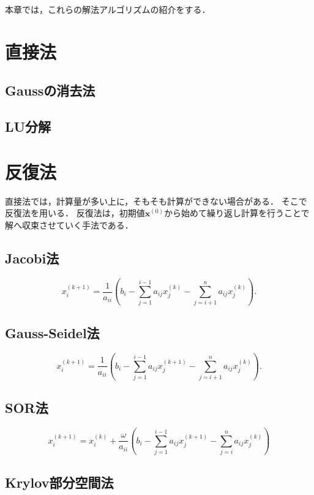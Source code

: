 本章では，これらの解法アルゴリズムの紹介をする．

\section{直接法}
\subsection{Gaussの消去法}

\subsection{LU分解}

\section{反復法}
直接法では，計算量が多い上に，そもそも計算ができない場合がある．
そこで反復法を用いる．
反復法は，初期値$\bm{x}^{(0)}$から始めて繰り返し計算を行うことで解へ収束させていく手法である．

\subsection{Jacobi法}
\begin{equation}
\label{e:jacobi}
x_i^{(k+1)}=\frac{1}{a_{ii}}\left(b_i-\sum_{j=1}^{i-1} a_{ij}x_j^{(k)}-\sum_{j=i+1}^n a_{ij}x_j^{(k)}\right).
\end{equation}


\subsection{Gauss-Seidel法}
\begin{equation}
\label{e:gaussseidel}
x_i^{(k+1)}=\frac{1}{a_{ii}}\left(b_i-\sum_{j=1}^{i-1}a_{ij}x_j^{(k+1)}-\sum_{j=i+1}^n a_{ij}x_j^{(k)}\right).
\end{equation}


\subsection{SOR法}
\begin{equation}
\label{e:sor}
x_i^{(k+1)}=x_i^{(k)}+\frac{\omega}{a_{ii}}\left(b_i-\sum_{j=1}^{i-1}a_{ij}x_j^{(k+1)}-\sum_{j=i}^n a_{ij}x_j^{(k)}\right)
\end{equation}


\subsection{Krylov部分空間法}

